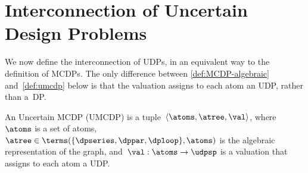 \section{Interconnection of Uncertain Design Problems\label{sec:UMCDP}}

We now define the interconnection of UDPs, in an equivalent way to
the definition of MCDPs. The only difference between \cref{def:MCDP-algebraic}
and~\cref{def:umcdp} below is that the valuation assigns to
each atom an UDP, rather than a~DP.
\begin{definition}
\label{def:umcdp}An Uncertain MCDP (UMCDP) is a tuple~$\left\langle \atoms,\atree,\val\right\rangle $,
where~$\atoms$ is a set of atoms,~$\atree\in\terms(\{\dpseries,\dppar,\dploop\},\atoms)$
is the algebraic representation of the graph, and~$\val:\atoms\rightarrow\udpsp$
is a valuation that assigns to each atom a UDP.
\end{definition}


